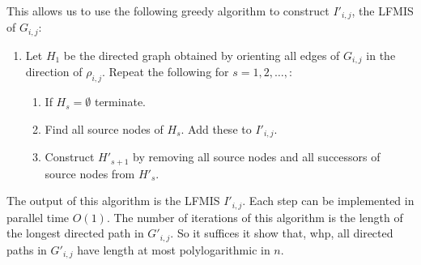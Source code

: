 This allows us to use the following greedy algorithm to construct $I'_{i,j}$, the LFMIS of $G_{i,j}$:
\begin{enumerate}
\item Let $H_1$  be the directed graph obtained by orienting all edges of $G_{i,j}$ in the direction of $\rho_{i,j}$. Repeat the following for $s = 1, 2, \dots,$:
\begin{enumerate}
\item[(2)] If $H_s = \emptyset$ terminate.
\item[(3)] Find all source nodes of $H_s$. Add these to $I'_{i,j}$.
\item[(4)]  Construct $H'_{s+1}$ by removing all source nodes and all successors of source nodes from $H'_s$.
\end{enumerate}
\end{enumerate}
The output of this algorithm is the LFMIS $I'_{i,j}$. Each step can be implemented in parallel time $O(1)$. The number of iterations of this algorithm is the length of the longest directed path in $G'_{i,j}$. So it suffices it show that, whp, all directed paths in $G'_{i,j}$ have length at most polylogarithmic in $n$.

